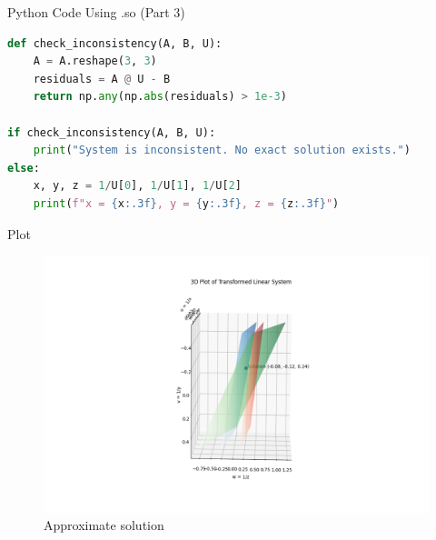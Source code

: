 \documentclass{beamer}
\begin{document}
\begin{frame}[fragile]{Python Code Using .so (Part 3)}
\begin{lstlisting}[language=Python]
def check_inconsistency(A, B, U):
    A = A.reshape(3, 3)
    residuals = A @ U - B
    return np.any(np.abs(residuals) > 1e-3)

if check_inconsistency(A, B, U):
    print("System is inconsistent. No exact solution exists.")
else:
    x, y, z = 1/U[0], 1/U[1], 1/U[2]
    print(f"x = {x:.3f}, y = {y:.3f}, z = {z:.3f}")
\end{lstlisting}
\end{frame}













\begin{frame}{Plot}
\begin{figure}[H]
    \centering
    \includegraphics[width=0.9\linewidth]{Figs/Fig1.png}
    \caption{Approximate solution}
    \label{fig:fig1}
\end{figure}
\end{frame}
\end{document}

